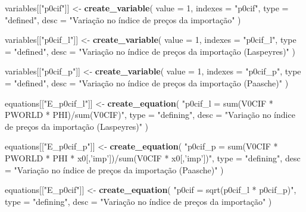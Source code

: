 \documentclass[12pt,twoside]{article}
\newenvironment{Shaded}{\begin{snugshade}}{\end{snugshade}}
\newcommand{\DataTypeTok}[1]{\textcolor[rgb]{0.13,0.29,0.53}{#1}}
\newcommand{\DecValTok}[1]{\textcolor[rgb]{0.00,0.00,0.81}{#1}}
\newcommand{\KeywordTok}[1]{\textcolor[rgb]{0.13,0.29,0.53}{\textbf{#1}}}
\newcommand{\NormalTok}[1]{#1}
\newcommand{\StringTok}[1]{\textcolor[rgb]{0.31,0.60,0.02}{#1}}
\let\oldShaded\Shaded
\let\endoldShaded\endShaded
\renewenvironment{Shaded}{\footnotesize\oldShaded}{\endoldShaded}
\begin{document}
\begin{Shaded}
\begin{Highlighting}[]
\NormalTok{variables[[}\StringTok{"p0cif"}\NormalTok{]] <-}\StringTok{ }\KeywordTok{create_variable}\NormalTok{(}
  \DataTypeTok{value =} \DecValTok{1}\NormalTok{,}
  \DataTypeTok{indexes =} \StringTok{"p0cif"}\NormalTok{,}
  \DataTypeTok{type =} \StringTok{"defined"}\NormalTok{,}
  \DataTypeTok{desc =} \StringTok{"Variação no índice de preços da importação"}
\NormalTok{)}

\NormalTok{variables[[}\StringTok{"p0cif_l"}\NormalTok{]] <-}\StringTok{ }\KeywordTok{create_variable}\NormalTok{(}
  \DataTypeTok{value =} \DecValTok{1}\NormalTok{,}
  \DataTypeTok{indexes =} \StringTok{"p0cif_l"}\NormalTok{,}
  \DataTypeTok{type =} \StringTok{"defined"}\NormalTok{,}
  \DataTypeTok{desc =} \StringTok{"Variação no índice de preços da importação (Laspeyres)"}
\NormalTok{)}

\NormalTok{variables[[}\StringTok{"p0cif_p"}\NormalTok{]] <-}\StringTok{ }\KeywordTok{create_variable}\NormalTok{(}
  \DataTypeTok{value =} \DecValTok{1}\NormalTok{,}
  \DataTypeTok{indexes =} \StringTok{"p0cif_p"}\NormalTok{,}
  \DataTypeTok{type =} \StringTok{"defined"}\NormalTok{,}
  \DataTypeTok{desc =} \StringTok{"Variação no índice de preços da importação (Paasche)"}
\NormalTok{)}

\NormalTok{equations[[}\StringTok{"E_p0cif_l"}\NormalTok{]] <-}\StringTok{ }\KeywordTok{create_equation}\NormalTok{(}
  \StringTok{"p0cif_l = sum(V0CIF * PWORLD * PHI)/sum(V0CIF)"}\NormalTok{,}
  \DataTypeTok{type =} \StringTok{"defining"}\NormalTok{,}
  \DataTypeTok{desc =} \StringTok{"Variação no índice de preços da importação (Laspeyres)"}
\NormalTok{)}

\NormalTok{equations[[}\StringTok{"E_p0cif_p"}\NormalTok{]] <-}\StringTok{ }\KeywordTok{create_equation}\NormalTok{(}
  \StringTok{"p0cif_p = sum(V0CIF * PWORLD * PHI * x0[,'imp'])/sum(V0CIF * x0[,'imp'])"}\NormalTok{,}
  \DataTypeTok{type =} \StringTok{"defining"}\NormalTok{,}
  \DataTypeTok{desc =} \StringTok{"Variação no índice de preços da importação (Paasche)"}
\NormalTok{)}

\NormalTok{equations[[}\StringTok{"E_p0cif"}\NormalTok{]] <-}\StringTok{ }\KeywordTok{create_equation}\NormalTok{(}
  \StringTok{"p0cif = sqrt(p0cif_l * p0cif_p)"}\NormalTok{,}
  \DataTypeTok{type =} \StringTok{"defining"}\NormalTok{,}
  \DataTypeTok{desc =} \StringTok{"Variação no índice de preços da importação"}
\NormalTok{)}
\end{Highlighting}
\end{Shaded}
\end{document}
